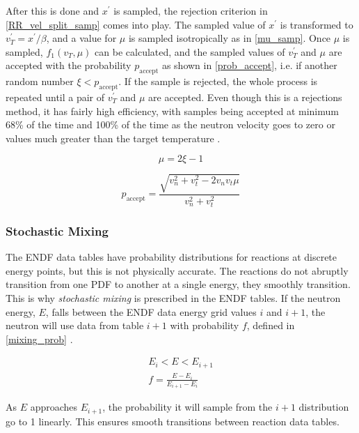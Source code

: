 After this is done and $x^\prime$ is sampled, the rejection criterion in \eqref{RR_vel_split_samp} comes into play.  The sampled value of $x^\prime$ is transformed to $v_T^\prime=x^\prime/\beta$, and a value for $\mu$ is sampled isotropically as in \eqref{mu_samp}.  Once $\mu$ is sampled, $f_1(v_T,\mu)$ can be calculated, and the sampled values of $v_T^\prime$ and $\mu$ are accepted with the probability $p_\mathrm{accept}$ as shown in \eqref{prob_accept}, i.e. if another random number $\xi<p_\mathrm{accept}$.  If the sample is rejected, the whole process is repeated until a pair of $v_T^\prime$ and $\mu$ are accepted.  Even though this is a rejections method, it has fairly high efficiency, with samples being accepted at minimum 68\% of the time and 100\% of the time as the neutron velocity goes to zero or values much greater than the target temperature \cite{mcnp}.

\begin{equation}
\label{mu_samp}
\mu = 2\xi - 1 
\end{equation}

\begin{equation}
\label{prob_accept}
p_\mathrm{accept} = \frac{\sqrt{v_n^2+v_t^2-2 v_n v_t \mu}}{v_n^2+v_t^2}
\end{equation}

\subsubsection{Stochastic Mixing}

The ENDF data tables have probability distributions for reactions at discrete energy points, but this is not physically accurate.  The reactions do not abruptly transition from one PDF to another at a single energy, they smoothly transition.  This is why \emph{stochastic mixing} is prescribed in the ENDF tables.  If the neutron energy, $E$, falls between the ENDF data energy grid values $i$ and $i+1$, the neutron will use data from table $i+1$ with probability $f$, defined in \eqref{mixing_prob} \cite{openmc}.

\begin{equation}
\label{mixing_prob}
\begin{gathered}
E_i < E < E_{i+1} \\
f = \frac{E-E_i}{E_{i+1}-E_i}
\end{gathered}
\end{equation}

As $E$ approaches $E_{i+1}$, the probability it will sample from the $i+1$ distribution go to 1 linearly.  This ensures smooth transitions between reaction data tables.


